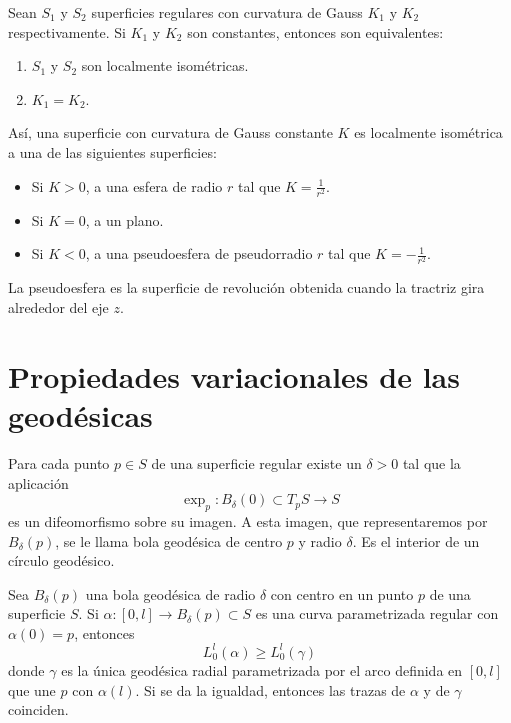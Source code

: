\begin{corollary}
    Sean $S_1$ y $S_2$ superficies regulares con curvatura de Gauss $K_1$ y $K_2$ respectivamente.
    Si $K_1$ y $K_2$ son constantes, entonces son equivalentes:
    \begin{enumerate}
        \item $S_1$ y $S_2$ son localmente isométricas.
        \item $K_1 = K_2$.
    \end{enumerate}
    Así, una superficie con curvatura de Gauss constante $K$ es localmente isométrica a una de las siguientes superficies:
    \begin{itemize}
        \item Si $K>0$, a una esfera de radio $r$ tal que $K = \frac{1}{r^2}$.
        \item Si $K=0$, a un plano.
        \item Si $K<0$, a una pseudoesfera de pseudorradio $r$ tal que $K = -\frac{1}{r^2}$.
    \end{itemize}
\end{corollary}

\begin{note}
    La pseudoesfera es la superficie de revolución obtenida cuando la tractriz gira alrededor del eje $z$.
\end{note}

\section{Propiedades variacionales de las geodésicas}

\begin{definition}
    Para cada punto $p \in S$ de una superficie regular existe un $\delta>0$ tal que la aplicación $$\exp_p : B_\delta(0) \subset T_pS \to S$$ es un difeomorfismo sobre su imagen.
    A esta imagen, que representaremos por $B_\delta(p)$, se le llama bola geodésica de centro $p$ y radio $\delta$.
    Es el interior de un círculo geodésico.
\end{definition}

\begin{proposition}
    Sea $B_\delta(p)$ una bola geodésica de radio $\delta$ con centro en un punto $p$ de una superficie $S$.
    Si $\alpha : [0, l] \to B_\delta(p) \subset S$ es una curva parametrizada regular con $\alpha(0) = p$, entonces
    $$L^l_0(\alpha) \geq L^l_0(\gamma)$$
    donde $\gamma$ es la única geodésica radial parametrizada por el arco definida en $[0, l]$ que une $p$ con $\alpha(l)$.
    Si se da la igualdad, entonces las trazas de $\alpha$ y de $\gamma$ coinciden.
\end{proposition}

